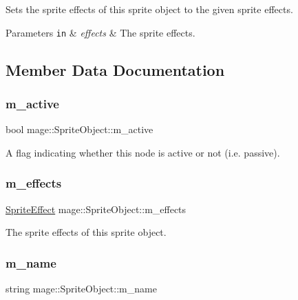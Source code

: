 Sets the sprite effects of this sprite object to the given sprite effects.


\begin{DoxyParams}[1]{Parameters}
\mbox{\tt in}  & {\em effects} & The sprite effects. \\
\hline
\end{DoxyParams}


\subsection{Member Data Documentation}
\hypertarget{classmage_1_1_sprite_object_a6694bb9cade83917202cf9ca6d359e81}{}\label{classmage_1_1_sprite_object_a6694bb9cade83917202cf9ca6d359e81} 
\subsubsection{\texorpdfstring{m\+\_\+active}{m\_active}}
{\footnotesize\ttfamily bool mage\+::\+Sprite\+Object\+::m\+\_\+active\hspace{0.3cm}{\ttfamily [private]}}

A flag indicating whether this node is active or not (i.\+e. passive). \hypertarget{classmage_1_1_sprite_object_a270f73b8d316f72c4228854d08a6d2ea}{}\label{classmage_1_1_sprite_object_a270f73b8d316f72c4228854d08a6d2ea} 
\subsubsection{\texorpdfstring{m\+\_\+effects}{m\_effects}}
{\footnotesize\ttfamily \hyperlink{namespacemage_a9cfe18123066ba4236f548f9de75d881}{Sprite\+Effect} mage\+::\+Sprite\+Object\+::m\+\_\+effects\hspace{0.3cm}{\ttfamily [private]}}

The sprite effects of this sprite object. \hypertarget{classmage_1_1_sprite_object_a6f2a859e40ed391909bb4c87a8b74480}{}\label{classmage_1_1_sprite_object_a6f2a859e40ed391909bb4c87a8b74480} 
\subsubsection{\texorpdfstring{m\+\_\+name}{m\_name}}
{\footnotesize\ttfamily string mage\+::\+Sprite\+Object\+::m\+\_\+name\hspace{0.3cm}{\ttfamily [private]}}

